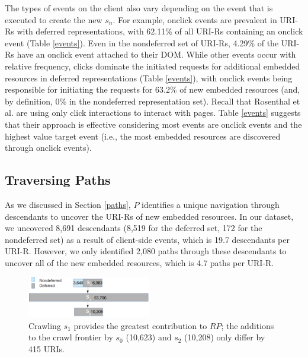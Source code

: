 \documentclass{sig-alternate}
\begin{document}


The types of events on the client also vary depending on the event that is executed to create the new $s_n$. For example, onclick events are prevalent in URI-Rs with deferred representations, with 62.11\% of all URI-Rs containing an onclick event (Table \ref{events}). Even in the nondeferred set of URI-Rs, 4.29\% of the URI-Rs have an onclick event attached to their DOM. While other events occur with relative frequency, clicks dominate the initiated requests for additional embedded resources in deferred representations (Table \ref{events}), with onclick events being responsible for initiating the requests for 63.2\% of new embedded resources (and, by definition, 0\% in the nondeferred representation set). Recall that Rosenthal et al. are using only click interactions to interact with pages. Table \ref{events} suggests that their approach is effective considering most events are onclick events and the highest value target event (i.e., the most embedded resources are discovered through onclick events). 


\subsection{Traversing Paths}
\label{traversingPaths}
As we discussed in Section \ref{paths}, $P$ identifies a unique navigation through descendants to uncover the URI-Rs of new embedded resources. In our dataset, we uncovered 8,691 descendants (8,519 for the deferred set, 172 for the nondeferred set) as a result of client-side events, which is 19.7 descendants per URI-R. However, we only identified 2,080 paths through these descendants to uncover all of the new embedded resources, which is 4.7 paths per URI-R. 


\begin{figure}
\centering
\includegraphics[width=0.48\textwidth]{./imgs/tree_diagram.png}
\caption{Crawling $s_1$ provides the greatest contribution to $RP$; the additions to the crawl frontier by $s_0$ (10,623) and $s_2$ (10,208) only differ by 415 URIs.}
\label{growth2a}
\end{figure}
\end{document}
